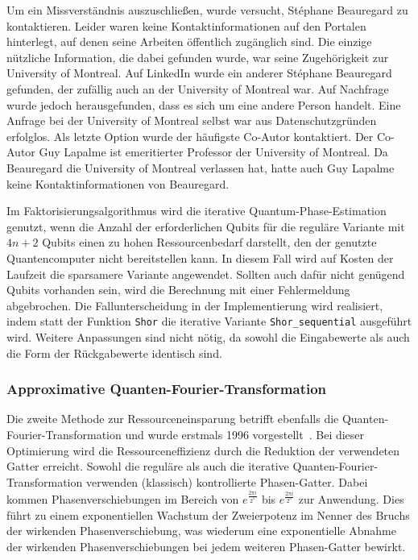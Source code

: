 Um ein Missverständnis auszuschließen, wurde versucht, Stéphane Beauregard zu kontaktieren. 
Leider waren keine Kontaktinformationen auf den Portalen hinterlegt, 
auf denen seine Arbeiten öffentlich zugänglich sind. 
Die einzige nützliche Information, die dabei gefunden wurde, 
war seine Zugehörigkeit zur University of Montreal. 
Auf LinkedIn wurde ein anderer Stéphane Beauregard gefunden, 
der zufällig auch an der University of Montreal war. Auf Nachfrage wurde jedoch herausgefunden, 
dass es sich um eine andere Person handelt. 
Eine Anfrage bei der University of Montreal selbst war aus Datenschutzgründen erfolglos. 
Als letzte Option wurde der häufigste Co-Autor kontaktiert. 
Der Co-Autor Guy Lapalme ist emeritierter Professor der University of Montreal.
Da Beauregard die University of Montreal verlassen hat, 
hatte auch Guy Lapalme keine Kontaktinformationen von Beauregard.

\vspace{1em}

Im Faktorisierungsalgorithmus wird die iterative Quantum-Phase-Estimation genutzt, 
wenn die Anzahl der erforderlichen Qubits für die reguläre Variante mit \(4n+2\) Qubits einen zu hohen Ressourcenbedarf darstellt, 
den der genutzte Quantencomputer nicht bereitstellen kann. 
In diesem Fall wird auf Kosten der Laufzeit die sparsamere Variante angewendet. 
Sollten auch dafür nicht genügend Qubits vorhanden sein, 
wird die Berechnung mit einer Fehlermeldung abgebrochen. 
Die Fallunterscheidung in der Implementierung wird realisiert, 
indem statt der Funktion \texttt{Shor} die iterative Variante \texttt{Shor\_sequential} ausgeführt wird. 
Weitere Anpassungen sind nicht nötig, 
da sowohl die Eingabewerte als auch die Form der Rückgabewerte identisch sind.

\subsubsection{Approximative Quanten-Fourier-Transformation} \label{sec:ApproxQFT}
Die zweite Methode zur Ressourceneinsparung betrifft ebenfalls die Quanten-Fourier-Transformation und 
wurde erstmals 1996 vorgestellt~\cite{Barenco_1996}.
Bei dieser Optimierung wird die Ressourceneffizienz durch die Reduktion der verwendeten Gatter erreicht. 
Sowohl die reguläre als auch die iterative Quanten-Fourier-Transformation verwenden (klassisch) kontrollierte Phasen-Gatter.
Dabei kommen Phasenverschiebungen im Bereich von \(e^{\frac{2\pi i}{2^1}}\) bis \(e^{\frac{2\pi i}{2^n}}\) zur Anwendung. 
Dies führt zu einem exponentiellen Wachstum der Zweierpotenz im Nenner des Bruchs der wirkenden Phasenverschiebung, 
was wiederum eine exponentielle Abnahme der wirkenden Phasenverschiebungen bei jedem weiteren Phasen-Gatter bewirkt. 

